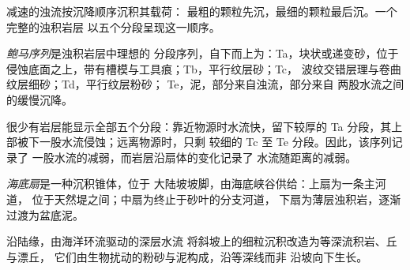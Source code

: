 减速的浊流按沉降顺序沉积其载荷：
最粗的颗粒先沉，最细的颗粒最后沉。一个完整的浊积岩层
以五个分段呈现这一顺序。

\begin{definition}[鲍马序列]\label{def:b3:facies-models:bouma}
\emph{鲍马序列}是浊积岩层中理想的
分段序列，自下而上为：Ta，块状或递变砂，位于
侵蚀底面之上，带有槽模与工具痕；Tb，平行纹层砂；Tc，
波纹交错层理与卷曲纹层细砂；Td，平行纹层粉砂；
Te，泥，部分来自浊流，部分来自
两股水流之间的缓慢沉降。
\end{definition}

很少有岩层能显示全部五个分段：靠近物源时水流快，留下较厚的
Ta 分段，其上部被下一股水流侵蚀；远离物源时，只剩
较细的 Tc 至 Te 分段。因此，该序列记录了
一股水流的减弱，而岩层沿扇体的变化记录了
水流随距离的减弱。

\begin{definition}[海底扇]\label{def:b3:facies-models:fan}
\emph{海底扇}是一种沉积锥体，位于
大陆坡坡脚，由海底峡谷供给：上扇为一条主河道，
位于天然堤之间；中扇为终止于砂叶的分支河道，
下扇为薄层浊积岩，逐渐过渡为盆底泥。
\end{definition}

沿陆缘，由海洋环流驱动的深层水流
将斜坡上的细粒沉积改造为等深流积岩、丘与漂丘，
它们由生物扰动的粉砂与泥构成，沿等深线而非
沿坡向下生长。

